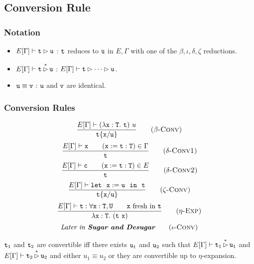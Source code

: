 \subsection{Conversion Rule}

\subsubsection{Notation}
\begin{itemize}
    \item $E[\Gamma]\vdash \tt t\rhd u$ : $\tt t$ reduces to $\tt u$ in $E,\Gamma$ with 
    one of the $\beta,\iota,\delta,\zeta$ reductions.
    \item $E[\Gamma]\vdash \tt t\mathop{\rhd}\limits^* u$ : $E[\Gamma]\vdash\tt t\rhd\cdots\rhd u$.
    \item $\tt u\equiv v$ : $\tt u$ and $\tt v$ are identical.
\end{itemize}

\subsubsection{Conversion Rules}
\begin{equation*}
\frac{E[\Gamma]\vdash(\lambda{\tt x:T.\ t})\ u}
    {\tt t\{x/u\}}
    \tag{\sc $\beta$-Conv}
\end{equation*}
\begin{equation*}
\frac{E[\Gamma]\vdash{\tt x}\qquad ({\tt x:=t:T})\in\Gamma}
    {\tt t}
    \tag{\sc $\delta$-Conv1}
\end{equation*}
\begin{equation*}
\frac{E[\Gamma]\vdash{\tt c}\qquad ({\tt x:=t:T})\in E}
    {\tt t}
    \tag{\sc $\delta$-Conv2}
\end{equation*}
\begin{equation*}
\frac{E[\Gamma]\vdash \tt let\ \ x:=u\ \ in\ \ t}
    {\tt t\{x/u\}}
    \tag{\sc $\zeta$-Conv}
\end{equation*}
\begin{equation*}
\frac{E[\Gamma]\vdash \tt t:\forall x:T,U\qquad x\text{ fresh in }t}
    {\tt \lambda\tt x:T.\ (t\ x)}
    \tag{\sc $\eta$-Exp}
\end{equation*}
\begin{equation*}
    \textit{Later in \textbf{Sugar and Desugar}}
    \tag{\sc $\iota$-Conv}
\end{equation*}

\begin{Def}[Convertibility]
$\tt t_1$ and $\tt t_2$ are convertible iff there exists $\tt u_1$ and $\tt u_2$ such that 
$E[\Gamma]\vdash \tt t_1\mathop{\rhd}\limits^* u_1$ and $E[\Gamma]\vdash \tt t_2\mathop{\rhd}\limits^* u_2$ 
and either $u_1\equiv u_2$ or they are convertible up to $\eta$-expansion.
\end{Def}

